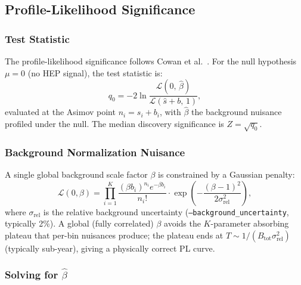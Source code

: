 \documentclass[12pt,a4paper]{article}
\newcommand{\bhat}{\hat{\beta}}
\newcommand{\srel}{\sigma_{\mathrm{rel}}}
\newcommand{\srelsq}{\sigma_{\mathrm{rel}}^{2}}
\begin{document}
\subsection{Profile-Likelihood Significance}
\label{sec:pl}

\subsubsection{Test Statistic}
\label{sec:pl_model}

The profile-likelihood significance follows Cowan et al.\ \cite{Cowan2010}.
For the null hypothesis $\mu=0$ (no HEP signal), the test statistic is:
\begin{equation}
  q_0 = -2\ln\!\frac{\mathcal{L}(0,\,\bhat)}{\mathcal{L}(\hat{s}+b,\,1)},
  \label{eq:q0}
\end{equation}
evaluated at the Asimov point $n_i = s_i + b_i$, with $\bhat$ the
background nuisance profiled under the null.
The median discovery significance is $Z = \sqrt{q_0}$.

\subsubsection{Background Normalization Nuisance}
\label{sec:pl_nuisance}

A single global background scale factor $\beta$ is constrained by a
Gaussian penalty:
\begin{equation}
  \mathcal{L}(0,\beta)
  = \prod_{i=1}^{K}
      \frac{(\beta b_i)^{n_i} e^{-\beta b_i}}{n_i!}
    \cdot\exp\!\left(-\frac{(\beta-1)^2}{2\srelsq}\right),
  \label{eq:likelihood}
\end{equation}
where $\srel$ is the relative background uncertainty
(\texttt{--background\_uncertainty}, typically 2\%).
A global (fully correlated) $\beta$ avoids the $K$-parameter absorbing
plateau that per-bin nuisances produce; the plateau ends at
$T \sim 1/(B_{\mathrm{tot}}\srelsq)$ (typically sub-year), giving
a physically correct PL curve.

\subsubsection{Solving for \texorpdfstring{$\bhat$}{beta-hat}}
\label{sec:betahat}
\end{document}
